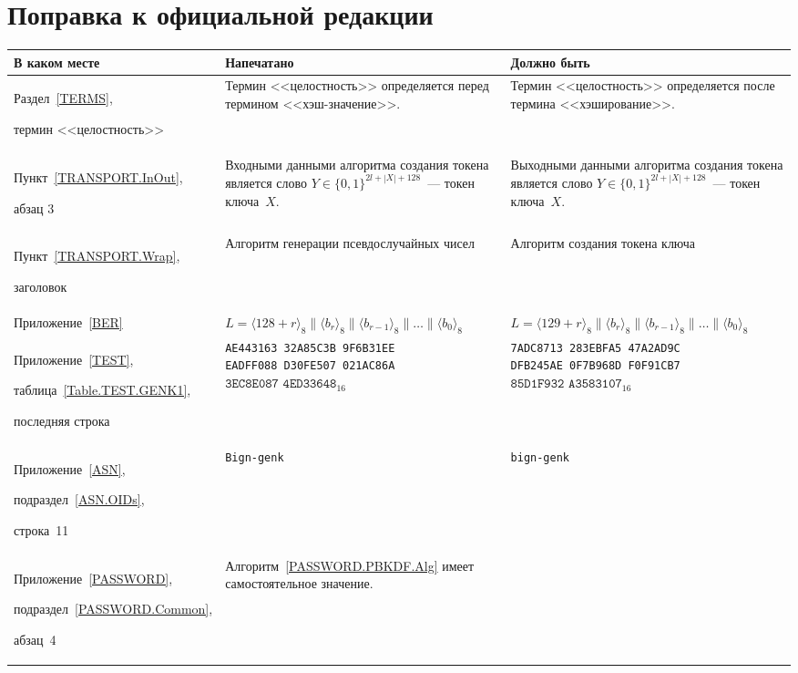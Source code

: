 \clearpage
\chapter*{\mbox{}\hfill Поправка к официальной редакции\hfill\mbox{}}

\mbox{}

\begin{center}
\begin{tabular}{|p{3.3cm}|p{6.1cm}|p{6.1cm}|}
\hline
В каком месте & Напечатано & Должно быть\\
\hline
\hline
Раздел~\ref{TERMS},\par
термин <<целостность>>
&
Термин <<целостность>> определяется перед термином <<хэш-значение>>.
&
Термин <<целостность>> определяется после термина <<хэширование>>.
\\
\hline
Пункт~\ref{TRANSPORT.InOut},\par
абзац 3 
&
Входными данными алгоритма создания токена является 
слово $Y\in\{0,1\}^{2l+|X|+128}$~--- токен ключа~$X$. 
&
Выходными данными алгоритма создания токена является 
слово $Y\in\{0,1\}^{2l+|X|+128}$~--- токен ключа~$X$.
\\
\hline
Пункт~\ref{TRANSPORT.Wrap},\par
заголовок
&
Алгоритм генерации псевдослучайных чисел &
Алгоритм создания токена ключа
\\
\hline
Приложение~\ref{BER} &
$L=\langle 128+r\rangle_8\parallel
\langle b_r\rangle_8\parallel
\langle b_{r-1}\rangle_8\parallel\ldots\parallel
\langle b_0\rangle_8$
&
$L=\langle 129+r\rangle_8\parallel
\langle b_r\rangle_8\parallel
\langle b_{r-1}\rangle_8\parallel\ldots\parallel
\langle b_0\rangle_8$
\\
\hline
Приложение~\ref{TEST},\par
таблица~\ref{Table.TEST.GENK1},\par
последняя строка &
\texttt{AE443163~32A85C3B~9F6B31EE} \texttt{EADFF088~D30FE507~021AC86A}
$\texttt{3EC8E087~4ED33648}_{16}$ 
&
\texttt{7ADC8713~283EBFA5~47A2AD9C} \texttt{DFB245AE~0F7B968D~F0F91CB7}
$\texttt{85D1F932~A3583107}_{16}$\\
\hline
Приложение~\ref{ASN},\par
подраздел~\ref{ASN.OIDs},\par
строка~11 &
\texttt{Bign-genk} &
\texttt{bign-genk}\\
%
\hline
Приложение~\ref{PASSWORD},\par
подраздел~\ref{PASSWORD.Common},\par
абзац~4 &
Алгоритм~\ref{PASSWORD.PBKDF.Alg} имеет самостоятельное значение.

\end{tabular}
\end{center}
